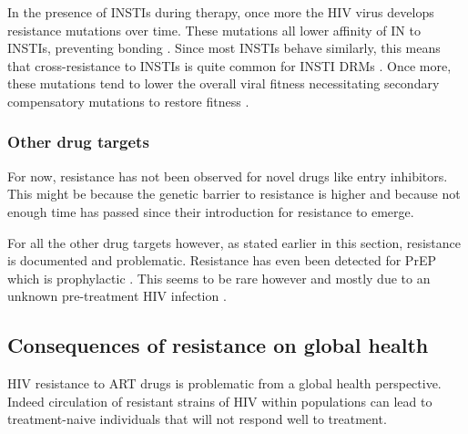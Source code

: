 \documentclass[
  11pt,
  twoside]{scrbook}
\begin{document}
In the presence of INSTIs during therapy, once more the HIV virus develops resistance mutations over time. These mutations all lower affinity of IN to INSTIs, preventing bonding \autocite{blancoHIV1IntegraseInhibitor2011,maertensStructureFunctionRetroviral2022}. Since most INSTIs behave similarly, this means that cross-resistance to INSTIs is quite common for INSTI DRMs \autocite{blancoHIV1IntegraseInhibitor2011,gerettiEmergingPatternsImplications2012}. Once more, these mutations tend to lower the overall viral fitness necessitating secondary compensatory mutations to restore fitness \autocite{gerettiEmergingPatternsImplications2012,blancoHIV1IntegraseInhibitor2011}.

\hypertarget{other-drug-targets}{%
\subsubsection{Other drug targets}\label{other-drug-targets}}

For now, resistance has not been observed for novel drugs like entry inhibitors. This might be because the genetic barrier to resistance is higher and because not enough time has passed since their introduction for resistance to emerge.

For all the other drug targets however, as stated earlier in this section, resistance is documented and problematic. Resistance has even been detected for PrEP which is prophylactic \autocite{knoxMultidrugResistantHIV1Infection2017,hurtPreexposureProphylaxisAntiretroviral2011}. This seems to be rare however and mostly due to an unknown pre-treatment HIV infection \autocite{gibasDrugResistanceHIV2019}.

\hypertarget{consequences-of-resistance-on-global-health}{%
\subsection{Consequences of resistance on global health}\label{consequences-of-resistance-on-global-health}}

HIV resistance to ART drugs is problematic from a global health perspective. Indeed circulation of resistant strains of HIV within populations can lead to treatment-naive individuals that will not respond well to treatment.
\end{document}
